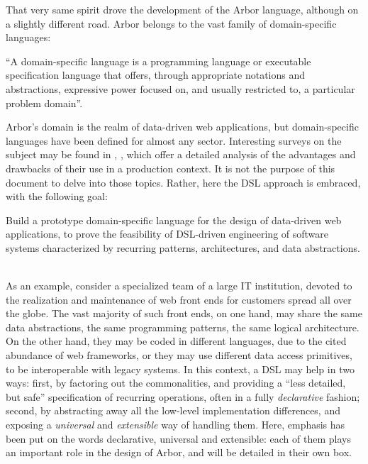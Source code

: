 \documentclass[12pt]{article} %
\newcommand{\ddwa}{data-driven web application}
\newcommand{\dsl}{domain-specific language}
\newcommand{\Dsl}{Domain-specific language}
\newcommand{\DSL}{DSL}
\newcommand{\A}{Arbor}
\newcommand{\q}[1]{``#1''}
\begin{document}
That very same spirit drove the development of the \A{} language, although on a slightly different road. \A{} belongs to the vast family of \dsl{}s\cite{dslannot}:

\q{A \dsl{} is a programming language or executable specification language that offers, through appropriate notations and abstractions, expressive power focused on, and usually restricted to, a particular problem domain}.

\A{}'s domain is the realm of data-driven web applications, but \dsl{}s have been defined for almost any sector. Interesting surveys on the subject may be found in \cite{dslannot}, \cite{dsltheor}, which offer a detailed analysis of the advantages and drawbacks of their use in a production context.
It is not the purpose of this document to delve into those topics. Rather, here the \DSL{} approach is embraced, with the following goal:
\begin{tcolorbox}[enhanced,title=Goal,fonttitle=\bfseries,
colframe=blue!50!black,colback=blue!10!white,colbacktitle=blue!5!yellow!10!white,lifted shadow={1mm}{-2mm}{3mm}{0.1mm}{black!50!white},fonttitle=\bfseries,coltitle=black,attach boxed title to top center=
{yshift=-0.25mm-\tcboxedtitleheight/2,yshifttext=2mm-\tcboxedtitleheight/2}]
Build a prototype \dsl{} for the design of \ddwa{}s, to prove the feasibility of \DSL{}-driven engineering of software systems characterized by recurring patterns, architectures, and data abstractions.
\end{tcolorbox}
~\\
As an example, consider a specialized team of a large IT institution, devoted to the realization and maintenance of web front ends for customers spread all over the globe. The vast majority of such front ends, on one hand, may share the same data abstractions, the same programming patterns, the same logical architecture. On the other hand, they may be coded in different languages, due to the cited abundance of web frameworks, or they may use different data access primitives, to be interoperable with legacy systems. In this context, a \DSL{} may help in two ways: first, by factoring out the commonalities, and providing a \q{less detailed, but safe} specification of recurring operations, often in a fully \emph{declarative} fashion; second, by abstracting away all the low-level implementation differences, and exposing a \emph{universal} and \emph{extensible} way of handling them. Here, emphasis has been put on the words declarative, universal and extensible: each of them plays an important role in the design of \A{}, and will be detailed in their own box.
\end{document}
